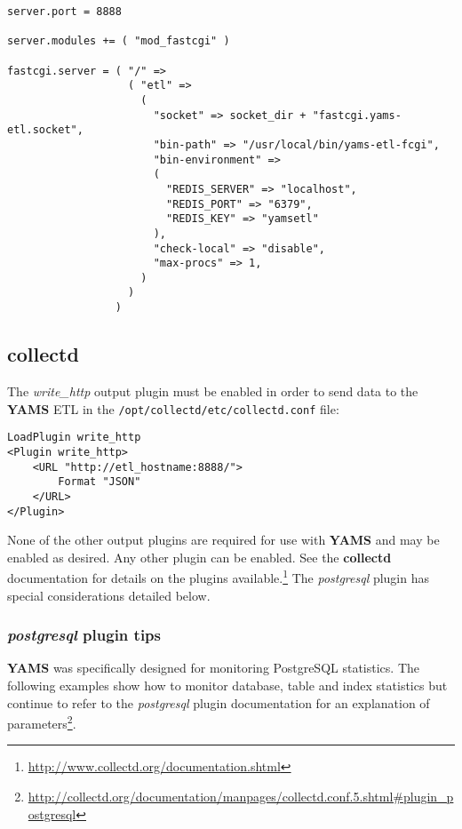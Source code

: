 \documentclass[a4paper,twoside,12pt]{article}
\begin{document}
\lstset{language=clean}
\begin{lstlisting}
server.port = 8888

server.modules += ( "mod_fastcgi" )

fastcgi.server = ( "/" =>
                   ( "etl" =>
                     (
                       "socket" => socket_dir + "fastcgi.yams-etl.socket",
                       "bin-path" => "/usr/local/bin/yams-etl-fcgi",
                       "bin-environment" =>
                       (
                         "REDIS_SERVER" => "localhost",
                         "REDIS_PORT" => "6379",
                         "REDIS_KEY" => "yamsetl"
                       ),
                       "check-local" => "disable",
                       "max-procs" => 1,
                     )
                   )
                 )
\end{lstlisting}

\subsection{collectd}

The \textit{write\_http} output plugin must be enabled in order to send data to
the \textbf{YAMS} ETL in the \texttt{/opt/collectd/etc/collectd.conf} file:
\lstset{language=xml}
\begin{lstlisting}
LoadPlugin write_http
<Plugin write_http>
    <URL "http://etl_hostname:8888/">
        Format "JSON"
    </URL>
</Plugin>
\end{lstlisting}

None of the other output plugins are required for use with \textbf{YAMS} and
may be enabled as desired.  Any other plugin can be enabled.  See the
\textbf{collectd} documentation for details on the plugins
available.\footnote{\url{http://www.collectd.org/documentation.shtml}}  The
\textit{postgresql} plugin has special considerations detailed below.

\subsubsection{\textit{postgresql} plugin tips}

\textbf{YAMS} was specifically designed for monitoring PostgreSQL statistics.
The following examples show how to monitor database, table and index
statistics but continue to refer to the \textit{postgresql} plugin
documentation for an explanation of
parameters\footnote{\url{http://collectd.org/documentation/manpages/collectd.conf.5.shtml#plugin_postgresql}}.
\end{document}
